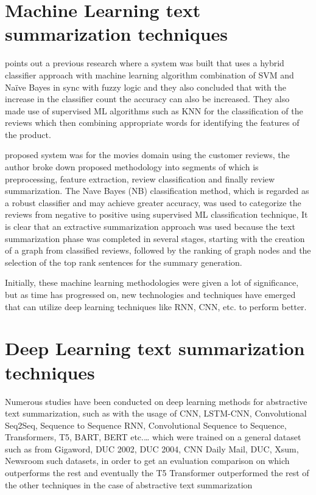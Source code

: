 \documentclass[manuscript,screen,natbib=false]{acmart}
\begin{document}
\section{Machine Learning text summarization techniques}
\cite{boorugu_ramesh_2020} points out a previous research where a system was built that uses a hybrid classifier approach with machine learning algorithm combination of SVM and Naïve Bayes in sync with fuzzy logic and they also concluded that with the increase in the classifier count the accuracy can also be increased. They also made use of supervised ML algorithms such as KNN for the classification of the reviews which then combining appropriate words for identifying the features of the product.

\cite{khan_gul_zareei_biswal_zeb_naeem_saeed_salim_2020} proposed system was for the movies domain using the customer reviews, the author broke down proposed methodology into segments of which is preprocessing, feature extraction, review classification and finally review summarization. The Nave Bayes (NB) classification method, which is regarded as a robust classifier and may achieve greater accuracy, was used to categorize the reviews from negative to positive using supervised ML classification technique, It is clear that an extractive summarization approach was used because the text summarization phase was completed in several stages, starting with the creation of a graph from classified reviews, followed by the ranking of graph nodes and the selection of the top rank sentences for the summary generation.

Initially, these machine learning methodologies were given a lot of significance, but as time has progressed on, new technologies and techniques have emerged that can utilize deep learning techniques like RNN, CNN, etc. to perform better.

\section{Deep Learning text summarization techniques}
Numerous studies have been conducted on deep learning methods for abstractive text summarization, such as with the usage of CNN, LSTM-CNN, Convolutional Seq2Seq, Sequence to Sequence RNN, Convolutional Sequence to Sequence, Transformers, T5, BART, BERT etc.… which were trained on a general dataset such as from Gigaword, DUC 2002, DUC 2004, CNN Daily Mail, DUC, Xsum, Newsroom such datasets, in order to get an evaluation comparison on which outperforms the rest and eventually the T5 Transformer outperformed the rest of the other techniques in the case of abstractive text summarization \cite{etemad_abidi_chhabra_2021}
\end{document}
